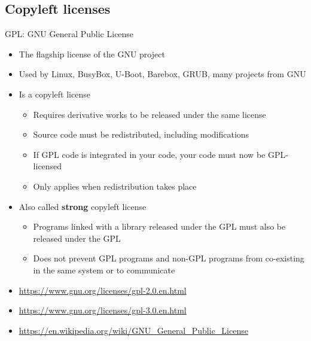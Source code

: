 \subsection{Copyleft licenses}

\begin{frame}{GPL: GNU General Public License}
  \begin{itemize}
  \item The flagship license of the GNU project
  \item Used by Linux, BusyBox, U-Boot, Barebox, GRUB, many projects from GNU
  \item Is a copyleft license
    \begin{itemize}
    \item Requires derivative works to be released under the same
      license
    \item Source code must be redistributed, including modifications
    \item If GPL code is integrated in your code, your code must now
      be GPL-licensed
    \item Only applies when redistribution takes place
    \end{itemize}
  \item Also called {\bf strong} copyleft license
    \begin{itemize}
    \item Programs linked with a library released under the GPL must
      also be released under the GPL
    \item Does not prevent GPL programs and non-GPL programs from
      co-existing in the same system or to communicate
    \end{itemize}
  \item \url{https://www.gnu.org/licenses/gpl-2.0.en.html}
  \item \url{https://www.gnu.org/licenses/gpl-3.0.en.html}
  \item \url{https://en.wikipedia.org/wiki/GNU_General_Public_License}
  \end{itemize}
\end{frame}

